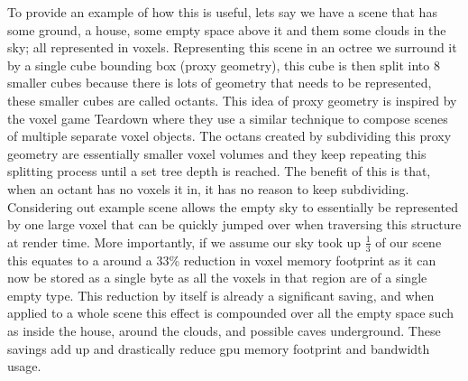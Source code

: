 \documentclass[titlepage]{article}
\begin{document}
To provide an example of how this is useful, lets say we have a scene that has some ground, a house, some empty space above it and them some clouds in the sky; all represented in voxels. Representing this scene in an octree we surround it by a single cube bounding box (proxy geometry), this cube is then split into 8 smaller cubes because there is lots of geometry that needs to be represented, these smaller cubes are called octants. This idea of proxy geometry is inspired by the voxel game Teardown \cite{proxy} where they use a similar technique to compose scenes of multiple separate voxel objects. The octans created by subdividing this proxy geometry are essentially smaller voxel volumes and they keep repeating this splitting process until a set tree depth is reached. The benefit of this is that, when an octant has no voxels it in, it has no reason to keep subdividing. Considering out example scene allows the empty sky to essentially be represented by one large voxel that can be quickly jumped over when traversing this structure at render time. More importantly, if we assume our sky took up $\frac{1}{3}$ of our scene this equates to a around a 33\% reduction in voxel memory footprint as it can now be stored as a single byte as all the voxels in that region are of a single empty type. This reduction by itself is already a significant saving, and when applied to a whole scene this effect is compounded over all the empty space such as inside the house, around the clouds, and possible caves underground. These savings add up and drastically reduce \gls{gpu} memory footprint and bandwidth usage.
\end{document}
